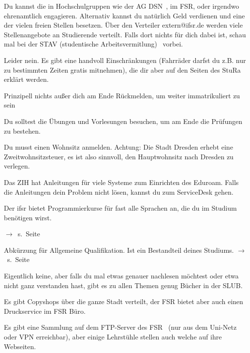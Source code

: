 Du kannst die in Hochschulgruppen wie der AG DSN~, im FSR, oder irgendwo ehrenamtlich engagieren. Alternativ kannst du natürlich Geld verdienen und eine der vielen freien Stellen besetzen. Über den Verteiler extern@ifsr.de werden viele Stellenangebote an Studierende verteilt. Falls dort nichts für dich dabei ist, schau mal bei der STAV (studentische Arbeitsvermitlung)~ vorbei.

Leider nein. Es gibt eine handvoll Einschränkungen (Fahrräder darfst du z.B. nur zu bestimmten Zeiten gratis mitnehmen), die dir aber auf den Seiten des StuRa~ erklärt werden.

Prinzipell nichts außer dich am Ende Rückmelden, um weiter immatrikuliert zu sein

Du solltest die Übungen und Vorlesungen besuchen, um am Ende die Prüfungen zu bestehen.

Du musst einen Wohnsitz anmelden. Achtung: Die Stadt Dresden erhebt eine Zweitwohnsitzsteuer, es ist also sinnvoll, den Hauptwohnsitz nach Dresden zu verlegen.

Das ZIH hat Anleitungen für viele Systeme zum Einrichten des Eduroam. Falls die Anleitungen dein Problem nicht lösen, kannst du zum ServiceDesk gehen.

Der ifsr bietet Programmierkurse für fast alle Sprachen an, die du im Studium benötigen wirst. 

\label{minisec:faq}
$\rightarrow$~s.~Seite~\pageref{minisec:faq}

Abkürzung für Allgemeine Qualifikation. Ist ein Bestandteil deines Studiums. $\rightarrow$~s.~Seite~\pageref{lec:aqua}

Eigentlich keine, aber falls du mal etwas genauer nachlesen möchtest oder etwa nicht ganz verstanden hast, gibt es zu allen Themen genug Bücher in der SLUB.

Es gibt Copyshops über die ganze Stadt verteilt, der FSR bietet aber auch einen Druckservice im FSR Büro.

Es gibt eine Sammlung auf dem FTP-Server des FSR~ (nur aus dem Uni-Netz oder VPN erreichbar), aber einige Lehrstühle stellen auch welche auf ihre Webseiten.
